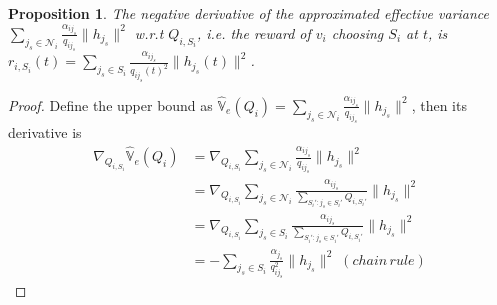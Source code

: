 \documentclass{article}
\newtheorem{proposition}{Proposition}
\begin{document}
\begin{proposition}\label{proposition:mp_derivative}
The negative derivative of the approximated effective variance $\sum_{j_s \in \mathcal{N}_i} \frac{\alpha_{ij_s}}{q_{ij_s}}\|h_{j_s}\|^2$ w.r.t $Q_{i,S_i}$,
i.e. the reward of $v_i$ choosing $S_i$ at $t$, is
$r_{i,S_i}(t) = \sum_{j_s \in S_i} \frac{\alpha_{ij_s}}{q_{ij_s}(t)^2}\|h_{j_s}(t)\|^2$.
\end{proposition}
\begin{proof}
Define the upper bound as $\hat{\mathbb{V}}_e(Q_i)= \sum_{j_s\in\mathcal{N}_i}\frac{\alpha_{ij_s}}{q_{ij_s}}\|h_{j_s}\|^2$,
then its derivative is 
\begin{align*}
\nabla_{Q_{i,S_i}}\hat{\mathbb{V}}_e(Q_i) &= \nabla_{Q_{i,S_i}}\sum_{j_s\in\mathcal{N}_i}\frac{\alpha_{ij_s}}{q_{ij_s}}\|h_{j_s}\|^2 \\
	&= \nabla_{Q_{i,S_i}}\sum_{j_s\in\mathcal{N}_i}\frac{\alpha_{ij_s}}{\sum_{S_i':j_s\in S_i'}Q_{i,S_i'}}\|h_{j_s}\|^2 \\
	&= \nabla_{Q_{i,S_i}}\sum_{j_s\in S_i}\frac{\alpha_{ij_s}}{\sum_{S_i':j_s\in S_i'}Q_{i,S_i'}}\|h_{j_s}\|^2 \\
	&= -\sum_{j_s\in S_i}\frac{\alpha_{j_s}}{q_{ij_s}^2}\|h_{j_s}\|^2 \; (chain\, rule)
\end{align*}
\end{proof}
\end{document}
